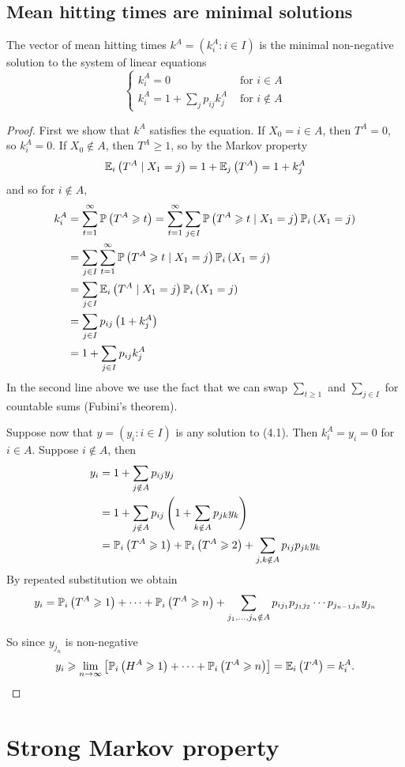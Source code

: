 \documentclass[a4paper]{article}
\begin{document}
\subsection{Mean hitting times are minimal solutions}
\begin{theorem}
    The vector of mean hitting times $k^{A}=\left(k_{i}^{A}: i \in I\right)$ is the minimal non-negative solution to the system of linear equations
    \[
    \begin{cases}k_{i}^{A}=0 & \text { for } i \in A \\ k_{i}^{A}=1+\sum_{j} p_{i j} k_{j}^{A} & \text { for } i \notin A\end{cases}
    \]
\end{theorem}
\begin{proof}
    First we show that $k^{A}$ satisfies the equation. If $X_{0}=i \in A$, then $T^{A}=0$, so $k_{i}^{A}=0$. If $X_{0} \notin A$, then $T^{A} \geq 1$, so by the Markov property
    \[
    {\mathbb{E}}_{i}\left(T^{A} \mid X_{1}=j\right)=1+{\mathbb{E}}_{j}\left(T^{A}\right)=1+k_{j}^{A}
    \]
    and so for $i \notin A$,
    \[
    \begin{aligned}
    k_{i}^{A} &=\sum_{t=1}^{\infty} {\mathbb{P}}\left(T^{A} \geqslant t\right)=\sum_{t=1}^{\infty} \sum_{j \in I} {\mathbb{P}}\left(T^{A} \geqslant t \mid X_{1}=j\right) {\mathbb{P}}_{i}\left(X_{1}=j\right) \\
    &=\sum_{j \in I} \sum_{t=1}^{\infty} {\mathbb{P}}\left(T^{A} \geqslant t \mid X_{1}=j\right) {\mathbb{P}}_{i}\left(X_{1}=j\right) \\
    &=\sum_{j \in I} {\mathbb{E}}_{i}\left(T^{A} \mid X_{1}=j\right) {\mathbb{P}}_{i}\left(X_{1}=j\right) \\
    &=\sum_{j \in I} p_{i j}\left(1+k_{j}^{A}\right) \\
    &=1+\sum_{j \in I} p_{i j} k_{j}^{A}
    \end{aligned}
    \]
    In the second line above we use the fact that we can swap $\sum_{t \geq 1}$ and $\sum_{j \in I}$ for countable sums (Fubini's theorem).

    Suppose now that $y=\left(y_{i}: i \in I\right)$ is any solution to (4.1). Then $k_{i}^{A}=y_{i}=0$ for $i \in A$. Suppose $i \notin A$, then
    \[
    \begin{aligned}
    y_{i} &=1+\sum_{j \notin A} p_{i j} y_{j} \\
    &=1+\sum_{j \notin A} p_{i j}\left(1+\sum_{k \notin A} p_{j k} y_{k}\right) \\
    &={\mathbb{P}}_{i}\left(T^{A} \geqslant 1\right)+{\mathbb{P}}_{i}\left(T^{A} \geqslant 2\right)+\sum_{j, k \notin A} p_{i j} p_{j k} y_{k}
    \end{aligned}
    \]
    By repeated substitution we obtain
    \[
    y_{i}={\mathbb{P}}_{i}\left(T^{A} \geqslant 1\right)+\cdots+{\mathbb{P}}_{i}\left(T^{A} \geqslant n\right)+\sum_{j_{1}, \ldots, j_{n} \notin A} p_{i j_{1}} p_{j_{1} j_{2}} \cdots p_{j_{n-1} j_{n}} y_{j_{n}}
    \]

    So since $y_{j_{n}}$ is non-negative
    \[
    y_{i} \geqslant \lim _{n \rightarrow \infty}\left[{\mathbb{P}}_{i}\left(H^{A} \geqslant 1\right)+\cdots+{\mathbb{P}}_{i}\left(T^{A} \geqslant n\right)\right]={\mathbb{E}}_{i}\left(T^{A}\right)=k_{i}^{A}.
    \]
\end{proof}

\section{Strong Markov property}
\end{document}
